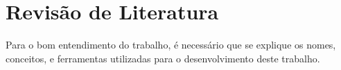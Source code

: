 
\chapter{Revisão de Literatura}

Para o bom entendimento do trabalho, é necessário que se explique os nomes, conceitos, e ferramentas utilizadas para o desenvolvimento deste trabalho. 



